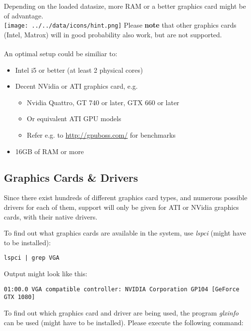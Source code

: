 Depending on the loaded datasize, more RAM or a better graphics card might be of advantage. \\

\texttt{[image: ../../data/icons/hint.png]} Please \textbf{note} that other graphics cards (Intel, Matrox) will in good probability also work, but are not supported. \\\\

An optimal setup could be similiar to:

\begin{itemize}  
\item Intel i5 or better (at least 2 physical cores)
\item Decent NVidia or ATI graphics card, e.g.
\begin{itemize}  
\item Nvidia Quattro, GT 740 or later, GTX 660 or later
\item Or equivalent ATI GPU models
\item Refer e.g. to \url{http://gpuboss.com/} for benchmarks
\end{itemize}
\item 16GB of RAM or more
\end{itemize}


\subsection{Graphics Cards \& Drivers}
\label{sec:graphics_installation}

Since there exist hundreds of different graphics card types, and numerous possible drivers for each of them, support will only be given for ATI or NVidia graphics cards, with their native drivers.

To find out what graphics cards are available in the system, use \textit{lspci} (might have to be installed):

\begin{lstlisting}
lspci | grep VGA
\end{lstlisting}

Output might look like this:

\begin{lstlisting}
01:00.0 VGA compatible controller: NVIDIA Corporation GP104 [GeForce GTX 1080]
\end{lstlisting}

To find out which graphics card and driver are being used, the program \textit{glxinfo} can be used (might have to be installed). Please execute the following command:

